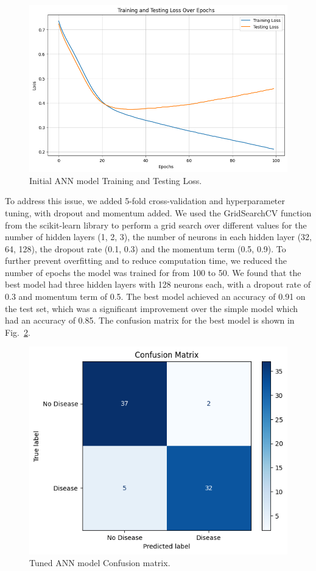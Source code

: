 \begin{figure}[htbp]
    \centerline{\includegraphics[width=0.8\columnwidth]{img/annoverfitting.png}}
    \caption{Initial ANN model Training and Testing Loss.}\label{annoverfitting}
\end{figure}

To address this issue, we added 5-fold cross-validation and hyperparameter tuning, with dropout and momentum added. We used the GridSearchCV function from the scikit-learn library to perform a grid search over different values for the number of hidden layers (1, 2, 3), the number of neurons in each hidden layer (32, 64, 128), the dropout rate (0.1, 0.3) and the momentum term (0.5, 0.9). To further prevent overfitting and to reduce computation time, we reduced the number of epochs the model was trained for from 100 to 50. We found that the best model had three hidden layers with 128 neurons each, with a dropout rate of 0.3 and momentum term of 0.5. The best model achieved an accuracy of 0.91 on the test set, which was a significant improvement over the simple model which had an accuracy of 0.85. The confusion matrix for the best model is shown in Fig.~\ref{annconfusion}.

\begin{figure}[htbp]
    \centerline{\includegraphics[width=0.8\columnwidth]{img/annconfusion.png}}
    \caption{Tuned ANN model Confusion matrix.}\label{annconfusion}
\end{figure}


